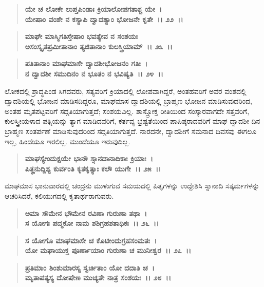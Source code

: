 \begin{verse}
\textbf{ಯೇ ಚ ಲೋಕೇ ಲುಪ್ತಪಿಂಡಾಃ ಕ್ರಿಯಾಲೋಪಗತಾಶ್ಚ ಯೇ~।}\\\textbf{ಯೇಷಾಂ ವಂಶೇ ನ ಕಸ್ಯಾಪಿ ದ್ವಾದಶ್ಯಾಂ ಭೋಜನೇ ಕೃತೇ~।। ೨೨~।।} 
\end{verse}

\begin{verse}
\textbf{ಮಾಘೇ ಮಾಸ್ಮಿಗತಿಸ್ತೇಷಾಂ ಭವತ್ಯೇವ ನ ಸಂಶಯಃ}\\\textbf{ಅಸಂಸ್ಕೃತಪ್ರಮೀತಾನಾಂ ತ್ಯಜಿತಾನಾಂ ಕುಲಸ್ತ್ರಿಯಾಮ್~।। ೨೩~।। }
\end{verse}

\begin{verse}
\textbf{ಪತಿತಾನಾಂ ಮಾಘಮಾಸೇ ದ್ವಾದಶೀಭೋಜನಂ ಗತಿಃ~।}\\\textbf{ನ ದ್ವಾದಶೀ ಸಮುದಿನಂ ನ ಭೂತಂ ನ ಭವಿಷ್ಯತಿ~।। ೨೪~।।}
\end{verse}

ಲೋಕದಲ್ಲಿ ಶ್ರಾದ್ಧಪಿಂಡ ಸಿಗದವರು, ಸತ್ಯವರಿಗೆ ಕ್ರಿಯಾದಲ್ಲಿ ಲೋಪವಾಗಿದ್ದರೆ, ಅಂತಹವರಿಗೆ ಅವರ ವಂಶದಲ್ಲಿ ದ್ವಾದಶಿಯಲ್ಲಿ ಭೋಜನ ಮಾಡಿಸದಿದ್ದರೂ, ಮಾಘಮಾಸ ದ್ವಾದಶಿಯಲ್ಲಿ ಬ್ರಾಹ್ಮಣ ಭೋಜನ ಮಾಡಿಸುವುದರಿಂದ, ಅಂತಹ ಮೃತಪಟ್ಟವರಿಗೆ ಸದ್ಗತಿಯಾಗುತ್ತದೆ; ಸಂಶಯವಿಲ್ಲ. ಶಾಸ್ತ್ರೋಕ್ತ ರೀತಿಯಿಂದ ಸಂಸ್ಕಾರವಾಗದೇ ಸತ್ತವರಿಗೆ, ಕುಲಸ್ತ್ರೀಯಳಾದ ಪತ್ನಿಯನ್ನು ತ್ಯಾಗ ಮಾಡಿದವರಿಗೆ, ಕರ್ತವ್ಯ ಭ್ರಷ್ಟತೆಯಿಂದ ಪಾಪಿಷ್ಠರಾದವರಿಗೆ ಮಾಘ ದ್ವಾದಶೀ ದಿನ ಬ್ರಾಹ್ಮಣ ಸಂತರ್ಪಣೆ ಮಾಡಿಸುವುದರಿಂದ ಸದ್ಗತಿಯಾಗುತ್ತದೆ. ನಾರದನೇ, ದ್ವಾದಶೀಗೆ ಸಮನಾದ ದಿವಸವು ಈಗಲೂ ಇಲ್ಲ, ಹಿಂದೆಯೂ ಇರಲಿಲ್ಲ. ಮುಂದೆಯೂ ಇರುವುದಿಲ್ಲ.

\begin{verse}
\textbf{ಮಾಘಸ್ಯೇಂದುಕ್ಷಯೇ ಭಾನೌ ಸ್ನಾನದಾನಾದಿಕಾಃ ಕ್ರಿಯಾಃ~।}\\\textbf{ಪಿತೄನುದ್ದಿಶ್ಯ ಕುರ್ವಂತಿ ಕೃತಕೃತ್ಯಾಃ ಕಲೌ ಯುಗೇ~।। ೨೫~।।}
\end{verse}

ಮಾಘಮಾಸ ಭಾನುವಾರದಲ್ಲಿ ಚಂದ್ರನು ಮುಳುಗುವ ಸಮಯದಲ್ಲಿ ಪಿತೃಗಳನ್ನು ಉದ್ದೇಶಿಸಿ ಸ್ನಾನಾದಿ ಸತ್ಕರ್ಮಗಳನ್ನು ಆಚರಿಸಿದರೆ, ಕಲಿಯುಗದಲ್ಲಿ ಕೃತಾರ್ಥರಾಗುವರು.

\begin{verse}
\textbf{ಅಮಾ ಸೌಮೇನ ಭೌಮೇನ ರವಿಣಾ ಗುರುಣಾ ತಥಾ~।}\\\textbf{ಸ ಯೋಗಃ ಪದ್ಮಕೋ ನಾಮ ಶಶಿಗ್ರಹಶತಾಧಿಕಃ~।। ೨೬~।। }
\end{verse}

\begin{verse}
\textbf{ಸ ಯೋಗೊ ಮಾಘಮಾಸೇ ಚ ಕೊಟೀಂದುಗ್ರಹಸಂಮತಃ~।}\\\textbf{ಯೋ ಮಘಾಯುಕ್ತ ಪೂರ್ಣಾಯಾಂ ಗುರುಣಾ ಚ ಮುನೀಶ್ವರ~।। ೨೭~।। }
\end{verse}

\begin{verse}
\textbf{ಪ್ರತಿಮಾಂ ಶಿಂಶುಮಾರಸ್ಯ ಸ್ವರ್ಚಿತಾಂ ಯೋ ದದಾತಿ ಚ~।}\\\textbf{ಮೃತಾಪತ್ಯಸ್ಯ ದೋಷೇಣ ಮುಚ್ಯತೇ ನಾತ್ರ ಸಂಶಯಃ~।। ೨೮~।।}
\end{verse}

